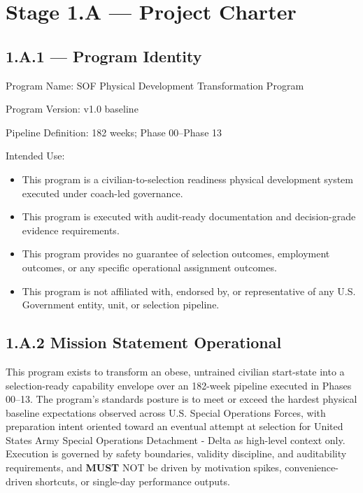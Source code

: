 \documentclass[10pt]{article}
\begin{document}
\section*{Stage 1.A — Project Charter}
{}

\subsection*{1.A.1 — Program Identity}
{}

Program Name: SOF Physical Development Transformation Program

Program Version: v1.0 baseline

Pipeline Definition: 182 weeks; Phase 00–Phase 13

Intended Use:

\begin{itemize}
\item This program is a civilian-to-selection readiness physical development system executed under coach-led governance.
\item This program is executed with audit-ready documentation and decision-grade evidence requirements.
\item This program provides no guarantee of selection outcomes, employment outcomes, or any specific operational assignment outcomes.
\item This program is not affiliated with, endorsed by, or representative of any U.S. Government entity, unit, or selection pipeline.
\end{itemize}

\subsection*{1.A.2 Mission Statement Operational}
{}

This program exists to transform an obese, untrained civilian start-state into a selection-ready capability envelope over an 182-week pipeline executed in Phases 00–13. The program’s standards posture is to meet or exceed the hardest physical baseline expectations observed across U.S. Special Operations Forces, with preparation intent oriented toward an eventual attempt at selection for United States Army Special Operations Detachment - Delta as high-level context only. Execution is governed by safety boundaries, validity discipline, and auditability requirements, and \textbf{MUST} NOT be driven by motivation spikes, convenience-driven shortcuts, or single-day performance outputs.
\end{document}
